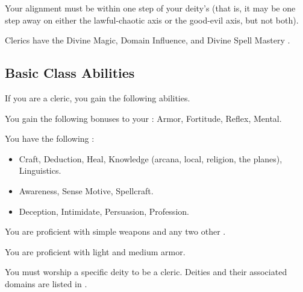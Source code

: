      Your alignment must be within one step of your deity's (that is, it may be one step away on either the lawful-chaotic axis or the good-evil axis, but not both).

     Clerics have the Divine Magic, Domain Influence, and Divine Spell Mastery .

    \subsection{Basic Class Abilities}
        If you are a cleric, you gain the following abilities.

        You gain the following bonuses to your :  Armor,  Fortitude,  Reflex,  Mental.

        You have the following :
        \begin{itemize}
            \item {} Craft, Deduction, Heal, Knowledge (arcana, local, religion, the planes), Linguistics.
            \item {} Awareness, Sense Motive, Spellcraft.
            \item {} Deception, Intimidate, Persuasion, Profession.
        \end{itemize}

        You are proficient with simple weapons and any two other .

        You are proficient with light and medium armor.

        You must worship a specific deity to be a cleric.
        Deities and their associated domains are listed in .

